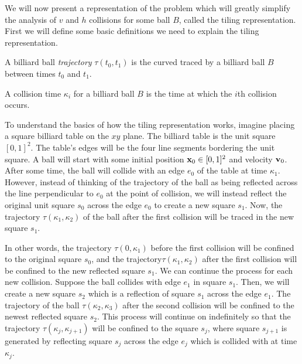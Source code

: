 We will now present a representation of the problem which will greatly simplify the analysis of $v$ and $h$ collisions for some ball $B$, called the tiling representation. First we will define some basic definitions we need to explain the tiling representation.

\begin{definition}
  A billiard ball \emph{trajectory} $\tau(t_0, t_1)$ is the curved traced by a billiard ball $B$ between times $t_0$ and $t_1$.
\end{definition}

\begin{definition}
  A collision time $\kappa_i$ for a billiard ball $B$ is the time at which the $i$th collision occurs.
\end{definition}

To understand the basics of how the tiling representation works, imagine placing a square billiard table on the $xy$ plane. The billiard table is the unit square$[0,1]^2$. The table's edges will be the four line segments bordering the unit square. A ball will start with some initial position $\mathbf{x}_0 \in [0,1]^2$ and velocity $\mathbf{v}_0$. After some time, the ball will collide with an edge $e_0$ of the table at time $\kappa_1$. However, instead of thinking of the trajectory of the ball as being reflected across the line perpendicular to $e_0$ at the point of collision, we will instead reflect the original unit square $s_0$ across the edge $e_0$ to create a new square $s_1$. Now, the trajectory $\tau(\kappa_1, \kappa_2)$ of the ball after the first collision will be traced in the new square $s_1$.

In other words, the trajectory $\tau(0, \kappa_1)$ before the first collision will be confined to the original square $s_0$, and the trajectory$\tau(\kappa_1, \kappa_2)$ after the first collision will be confined to the new reflected square $s_1$. We can continue the process for each new collision. Suppose the ball collides with edge $e_1$ in square $s_1$. Then, we will create a new square $s_2$ which is a reflection of square $s_1$ across the edge $e_1$. The trajectory of the ball $\tau(\kappa_2, \kappa_3)$ after the second collision will be confined to the newest reflected square $s_2$. This process will continue on indefinitely so that the trajectory $\tau(\kappa_j, \kappa_{j+1})$ will be confined to the square $s_j$, where square $s_{j+1}$ is generated by reflecting square $s_{j}$ across the edge $e_{j}$ which is collided with at time $\kappa_j$.

